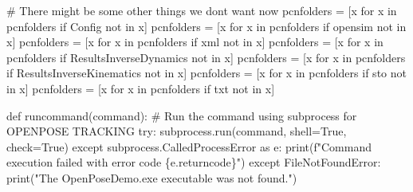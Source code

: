 \documentclass[
  letterpaper,
  DIV=11,
  numbers=noendperiod]{scrreprt}
\newenvironment{Shaded}{\begin{snugshade}}{\end{snugshade}}
\newcommand{\BuiltInTok}[1]{\textcolor[rgb]{0.00,0.23,0.31}{#1}}
\newcommand{\CommentTok}[1]{\textcolor[rgb]{0.37,0.37,0.37}{#1}}
\newcommand{\ControlFlowTok}[1]{\textcolor[rgb]{0.00,0.23,0.31}{#1}}
\newcommand{\ImportTok}[1]{\textcolor[rgb]{0.00,0.46,0.62}{#1}}
\newcommand{\KeywordTok}[1]{\textcolor[rgb]{0.00,0.23,0.31}{#1}}
\newcommand{\NormalTok}[1]{\textcolor[rgb]{0.00,0.23,0.31}{#1}}
\newcommand{\OperatorTok}[1]{\textcolor[rgb]{0.37,0.37,0.37}{#1}}
\newcommand{\PreprocessorTok}[1]{\textcolor[rgb]{0.68,0.00,0.00}{#1}}
\newcommand{\SpecialCharTok}[1]{\textcolor[rgb]{0.37,0.37,0.37}{#1}}
\newcommand{\SpecialStringTok}[1]{\textcolor[rgb]{0.13,0.47,0.30}{#1}}
\newcommand{\StringTok}[1]{\textcolor[rgb]{0.13,0.47,0.30}{#1}}
\newcommand{\VariableTok}[1]{\textcolor[rgb]{0.07,0.07,0.07}{#1}}
\begin{document}
\begin{Shaded}
\begin{Highlighting}[]
\CommentTok{\# There might be some other things we don\textquotesingle{}t want now}
\NormalTok{pcnfolders }\OperatorTok{=}\NormalTok{ [x }\ControlFlowTok{for}\NormalTok{ x }\KeywordTok{in}\NormalTok{ pcnfolders }\ControlFlowTok{if} \StringTok{\textquotesingle{}Config\textquotesingle{}} \KeywordTok{not} \KeywordTok{in}\NormalTok{ x]}
\NormalTok{pcnfolders }\OperatorTok{=}\NormalTok{ [x }\ControlFlowTok{for}\NormalTok{ x }\KeywordTok{in}\NormalTok{ pcnfolders }\ControlFlowTok{if} \StringTok{\textquotesingle{}opensim\textquotesingle{}} \KeywordTok{not} \KeywordTok{in}\NormalTok{ x]}
\NormalTok{pcnfolders }\OperatorTok{=}\NormalTok{ [x }\ControlFlowTok{for}\NormalTok{ x }\KeywordTok{in}\NormalTok{ pcnfolders }\ControlFlowTok{if} \StringTok{\textquotesingle{}xml\textquotesingle{}} \KeywordTok{not} \KeywordTok{in}\NormalTok{ x]}
\NormalTok{pcnfolders }\OperatorTok{=}\NormalTok{ [x }\ControlFlowTok{for}\NormalTok{ x }\KeywordTok{in}\NormalTok{ pcnfolders }\ControlFlowTok{if} \StringTok{\textquotesingle{}ResultsInverseDynamics\textquotesingle{}} \KeywordTok{not} \KeywordTok{in}\NormalTok{ x]}
\NormalTok{pcnfolders }\OperatorTok{=}\NormalTok{ [x }\ControlFlowTok{for}\NormalTok{ x }\KeywordTok{in}\NormalTok{ pcnfolders }\ControlFlowTok{if} \StringTok{\textquotesingle{}ResultsInverseKinematics\textquotesingle{}} \KeywordTok{not} \KeywordTok{in}\NormalTok{ x]}
\NormalTok{pcnfolders }\OperatorTok{=}\NormalTok{ [x }\ControlFlowTok{for}\NormalTok{ x }\KeywordTok{in}\NormalTok{ pcnfolders }\ControlFlowTok{if} \StringTok{\textquotesingle{}sto\textquotesingle{}} \KeywordTok{not} \KeywordTok{in}\NormalTok{ x]}
\NormalTok{pcnfolders }\OperatorTok{=}\NormalTok{ [x }\ControlFlowTok{for}\NormalTok{ x }\KeywordTok{in}\NormalTok{ pcnfolders }\ControlFlowTok{if} \StringTok{\textquotesingle{}txt\textquotesingle{}} \KeywordTok{not} \KeywordTok{in}\NormalTok{ x]}
\end{Highlighting}
\end{Shaded}

\begin{Shaded}
\begin{Highlighting}[]
\KeywordTok{def}\NormalTok{ runcommand(command):}
    \CommentTok{\# Run the command using subprocess for OPENPOSE TRACKING}
    \ControlFlowTok{try}\NormalTok{:}
\NormalTok{        subprocess.run(command, shell}\OperatorTok{=}\VariableTok{True}\NormalTok{, check}\OperatorTok{=}\VariableTok{True}\NormalTok{)}
    \ControlFlowTok{except}\NormalTok{ subprocess.CalledProcessError }\ImportTok{as}\NormalTok{ e:}
        \BuiltInTok{print}\NormalTok{(}\SpecialStringTok{f"Command execution failed with error code }\SpecialCharTok{\{}\NormalTok{e}\SpecialCharTok{.}\NormalTok{returncode}\SpecialCharTok{\}}\SpecialStringTok{"}\NormalTok{)}
    \ControlFlowTok{except} \PreprocessorTok{FileNotFoundError}\NormalTok{:}
        \BuiltInTok{print}\NormalTok{(}\StringTok{"The OpenPoseDemo.exe executable was not found."}\NormalTok{)}
\end{Highlighting}
\end{Shaded}
\end{document}
